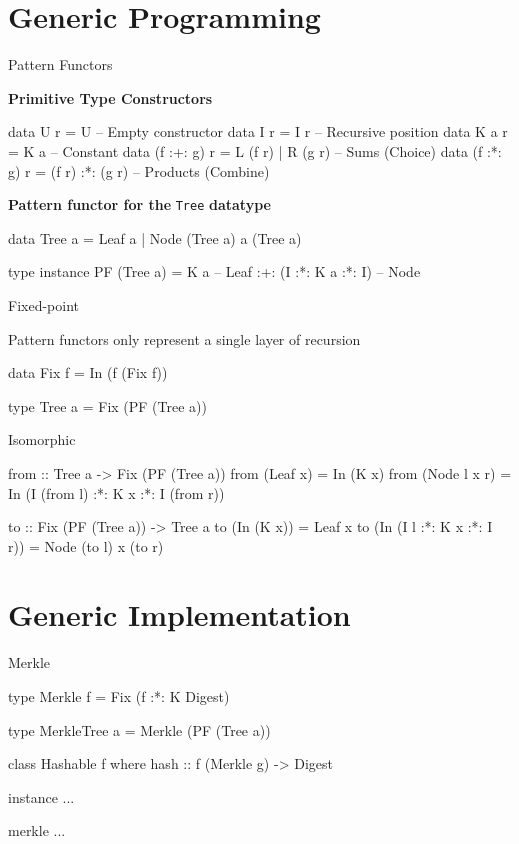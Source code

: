 \section{Generic Programming}

\begin{slide}{Pattern Functors}

\textbf{Primitive Type Constructors}

\begin{haskell}
data U r         = U                 -- Empty constructor
data I r         = I r               -- Recursive position
data K a r       = K a               -- Constant
data (f :+: g) r = L (f r) | R (g r) -- Sums (Choice)
data (f :*: g) r = (f r) :*: (g r)   -- Products (Combine)
\end{haskell}

\textbf{Pattern functor for the} \texttt{Tree} \textbf{datatype}

\begin{haskell}
data Tree a = Leaf a | Node (Tree a) a (Tree a)

type instance PF (Tree a) = K a                -- Leaf
                         :+: (I :*: K a :*: I) -- Node
\end{haskell}
\end{slide}

\begin{slide}{Fixed-point}

Pattern functors only represent a single layer of recursion
  
\begin{haskell}
data Fix f = In (f (Fix f))

type Tree a = Fix (PF (Tree a))
\end{haskell}

Isomorphic

\begin{haskell}
from :: Tree a -> Fix (PF (Tree a))
from (Leaf x)     = In (K x)
from (Node l x r) = In (I (from l) :*: K x :*: I (from r)) 

to :: Fix (PF (Tree a)) -> Tree a
to (In (K x))                 = Leaf x
to (In (I l :*: K x :*: I r)) = Node (to l) x (to r)
\end{haskell}
\end{slide}

\section{Generic Implementation}

\begin{slide}{Merkle}
\begin{haskell}
type Merkle f = Fix (f :*: K Digest)

type MerkleTree a = Merkle (PF (Tree a))

class Hashable f where
  hash :: f (Merkle g) -> Digest

instance ...

merkle ...
\end{haskell}
\end{slide}